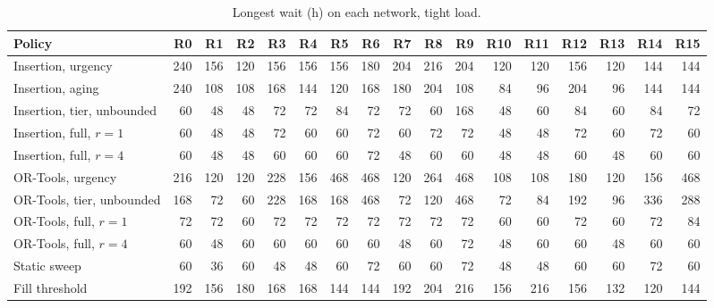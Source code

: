 \begin{table}[!htbp]
\caption{Longest wait (h) on each network, tight load.}
\label{tab:networks_tight}
\centering
\footnotesize
\setlength{\tabcolsep}{1.8pt}
\begin{tabular}{lrrrrrrrrrrrrrrrr}
\toprule
Policy & R0 & R1 & R2 & R3 & R4 & R5 & R6 & R7 & R8 & R9 & R10 & R11 & R12 & R13 & R14 & R15 \\
\midrule
Insertion, urgency & 240 & 156 & 120 & 156 & 156 & 156 & 180 & 204 & 216 & 204 & 120 & 120 & 156 & 120 & 144 & 144 \\
Insertion, aging & 240 & 108 & 108 & 168 & 144 & 120 & 168 & 180 & 204 & 108 & 84 & 96 & 204 & 96 & 144 & 144 \\
Insertion, tier, unbounded & 60 & 48 & 48 & 72 & 72 & 84 & 72 & 72 & 60 & 168 & 48 & 60 & 84 & 60 & 84 & 72 \\
Insertion, full, $r = 1$ & 60 & 48 & 48 & 72 & 60 & 60 & 72 & 60 & 72 & 72 & 48 & 48 & 72 & 60 & 72 & 60 \\
Insertion, full, $r = 4$ & 60 & 48 & 48 & 60 & 60 & 60 & 72 & 48 & 60 & 60 & 48 & 48 & 60 & 48 & 60 & 60 \\
OR-Tools, urgency & 216 & 120 & 120 & 228 & 156 & 468 & 468 & 120 & 264 & 468 & 108 & 108 & 180 & 120 & 156 & 468 \\
OR-Tools, tier, unbounded & 168 & 72 & 60 & 228 & 168 & 168 & 468 & 72 & 120 & 468 & 72 & 84 & 192 & 96 & 336 & 288 \\
OR-Tools, full, $r = 1$ & 72 & 72 & 60 & 72 & 72 & 72 & 72 & 72 & 72 & 72 & 60 & 60 & 72 & 60 & 72 & 84 \\
OR-Tools, full, $r = 4$ & 60 & 48 & 60 & 60 & 60 & 60 & 60 & 48 & 60 & 72 & 48 & 60 & 60 & 48 & 60 & 60 \\
Static sweep & 60 & 36 & 60 & 48 & 48 & 60 & 72 & 60 & 60 & 72 & 48 & 48 & 60 & 60 & 72 & 60 \\
Fill threshold & 192 & 156 & 180 & 168 & 168 & 144 & 144 & 192 & 204 & 216 & 156 & 216 & 156 & 132 & 120 & 144 \\
\bottomrule
\end{tabular}
\end{table}

